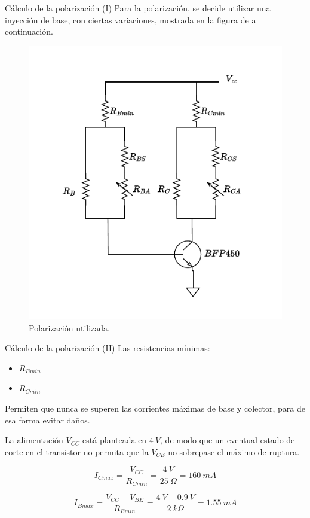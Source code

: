 \documentclass[9pt]{beamer}
\begin{document}
	\begin{frame}{Cálculo de la polarización (I)}
		Para la polarización, se decide utilizar una inyección de base, con ciertas variaciones, mostrada en la figura de a continuación.
		
		\begin{figure}
			\centering
			\includegraphics[width=0.5\linewidth]{img/polarizacion}
			\caption{Polarización utilizada.}
			\label{fig:polarizacion}
		\end{figure}
		
	\end{frame}
	
	\begin{frame}{Cálculo de la polarización (II)}
		Las resistencias mínimas:
		\begin{itemize}[label=\textbullet]
			\item $R_{Bmin}$
			\item $R_{Cmin}$
		\end{itemize}
		Permiten que nunca se superen las corrientes máximas de base y colector, para de esa forma evitar daños.
		
		La alimentación $V_{CC}$ está planteada en $4 \ V$, de modo que un eventual estado de corte en el transistor no permita que la $V_{CE}$ no sobrepase el máximo de ruptura.
		
		$$ I_{Cmax}=\frac{V_{CC}}{R_{Cmin}}=\frac{4 \ V}{25 \ \Omega}=160 \ mA$$
		
		$$ I_{Bmax}=\frac{V_{CC}-V_{BE}}{R_{Bmin}} = \frac{4 \ V - 0.9 \ V}{2 \ k\Omega}=1.55 \ mA$$
	\end{frame}
	
\end{document}
